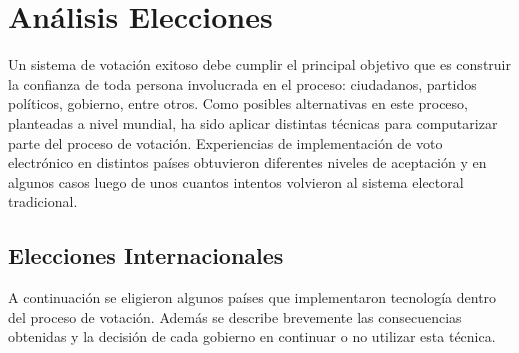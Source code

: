 \chapter{Análisis Elecciones}
\label{Elecciones}
Un sistema de votación exitoso debe cumplir el principal objetivo que es construir la confianza de toda persona involucrada en el proceso: ciudadanos, partidos políticos, gobierno, entre otros. Como posibles alternativas en este proceso, planteadas a nivel mundial, ha sido aplicar distintas técnicas para computarizar parte del proceso de votación. 
Experiencias de implementación de voto electrónico en distintos países obtuvieron diferentes niveles de aceptación y en algunos casos luego de unos cuantos intentos volvieron al sistema electoral tradicional.

\section{Elecciones Internacionales}
A continuación se eligieron algunos países que implementaron tecnología dentro del proceso de votación. Además se describe brevemente las consecuencias obtenidas y la decisión de cada gobierno en continuar o no utilizar esta técnica.

